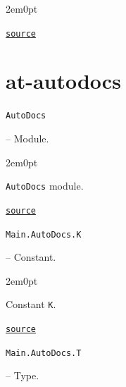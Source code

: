 \begin{adjustwidth}{2em}{0pt}


\href{https://example.org/Repository.jl/blob/make.jl#L44-74}{\texttt{source}}


\end{adjustwidth}

\section{at-autodocs}



\label{17848419264812669351}{}

\hypertarget{11302554442225637105}{\texttt{AutoDocs}}  -- {Module.}

\begin{adjustwidth}{2em}{0pt}

\texttt{AutoDocs} module.



\href{https://example.org/Repository.jl/blob/make.jl#L78-78}{\texttt{source}}


\end{adjustwidth}
\hypertarget{15441025252371609530}{\texttt{Main.AutoDocs.K}}  -- {Constant.}

\begin{adjustwidth}{2em}{0pt}

Constant \texttt{K}.



\href{https://example.org/Repository.jl/blob/make.jl#L91-91}{\texttt{source}}


\end{adjustwidth}
\hypertarget{12338358314596597808}{\texttt{Main.AutoDocs.T}}  -- {Type.}

